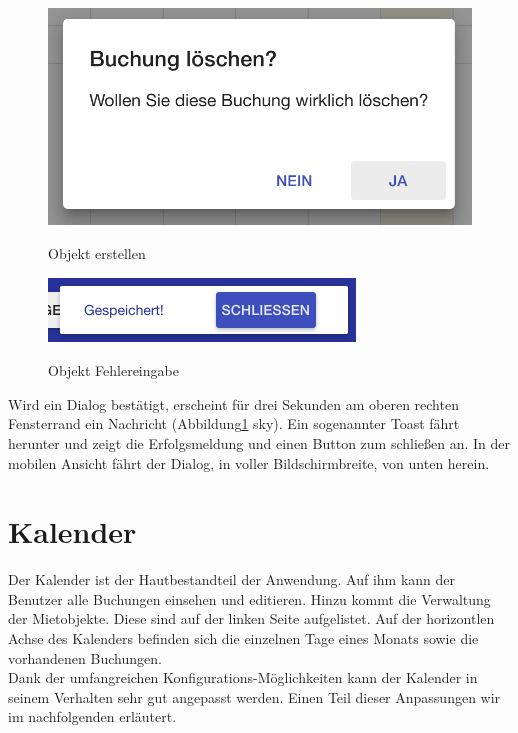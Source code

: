 \begin{figure}[H]
    \centering
    \begin{minipage}[t]{0.49\linewidth}
        \centering
        \includegraphics[width=\linewidth]{images/frontend_booking_delete_dialog.png}
        \label{frontend_booking_delete_dialog}
        \caption{Objekt erstellen}
    \end{minipage}%
    \hfill
    \begin{minipage}[t]{0.49\linewidth}
        \centering
        \includegraphics[width=\linewidth]{images/frontend_toast.png}
        \label{frontend_toast}
        \caption{Objekt Fehlereingabe}
    \end{minipage}
\end{figure}



Wird ein Dialog bestätigt, erscheint für drei Sekunden am oberen rechten Fensterrand ein Nachricht (Abbildung\ref{frontend_toast} sky). Ein sogenannter Toast fährt herunter und zeigt die Erfolgsmeldung und einen Button zum schließen an. In der mobilen Ansicht fährt der Dialog, in voller Bildschirmbreite, von unten herein. 

\section{Kalender}
Der Kalender ist der Hautbestandteil der Anwendung. Auf ihm kann der Benutzer alle Buchungen einsehen und editieren. Hinzu kommt die Verwaltung der Mietobjekte.
Diese sind auf der linken Seite aufgelistet. Auf der horizontlen Achse des Kalenders befinden sich die einzelnen Tage eines Monats sowie die vorhandenen Buchungen.\\
Dank der umfangreichen Konfigurations-Möglichkeiten kann der Kalender in seinem Verhalten sehr gut angepasst werden.
Einen Teil dieser Anpassungen wir im nachfolgenden erläutert.

